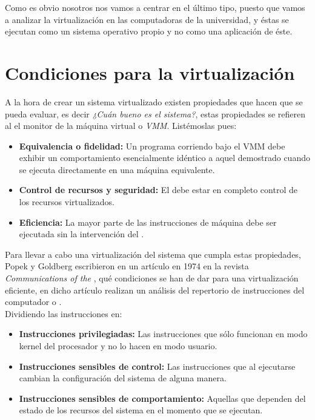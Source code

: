 Como es obvio nosotros nos vamos a centrar en el último tipo, puesto que vamos a analizar la virtualización en las computadoras de la universidad, y éstas se ejecutan como un sistema operativo propio y no como una aplicación de éste.

\section{Condiciones para la virtualización}

A la hora de crear un sistema virtualizado existen propiedades que hacen que se pueda evaluar, es decir \emph{¿Cuán bueno es el sistema?}, estas propiedades se refieren al el monitor de la máquina virtual o \emph{VMM}. Listémoslas pues:
\begin{itemize}
\item \textbf{Equivalencia o fidelidad:} Un programa corriendo bajo el VMM debe exhibir un comportamiento  esencialmente idéntico a aquel demostrado cuando se ejecuta directamente en una máquina equivalente.
\item \textbf{Control de recursos y seguridad:} El  debe estar en completo control de los recursos virtualizados.
\item \textbf{Eficiencia:} La mayor parte de las instrucciones de máquina debe ser ejecutada sin la intervención del .
\end{itemize}

Para llevar a cabo una virtualización del sistema que cumpla estas propiedades, Popek y Goldberg escribieron en un artículo en 1974 en la revista \emph{Communications of the }\cite{reqvir}, qué condiciones se han de dar para una virtualización eficiente, en dicho artículo realizan un análisis del repertorio de instrucciones del computador o \emph{}.\\

Dividiendo las instrucciones en:
\begin{itemize}
\item \textbf{Instrucciones privilegiadas:} Las instrucciones que sólo funcionan en modo kernel del procesador y no lo hacen en modo usuario.
\item \textbf{Instrucciones sensibles de control:} Las instrucciones que al ejecutarse cambian la configuración del sistema de alguna manera.
\item \textbf{Instrucciones sensibles de comportamiento:} Aquellas que dependen del estado de los recursos del sistema en el momento que se ejecutan. 
\end{itemize}

